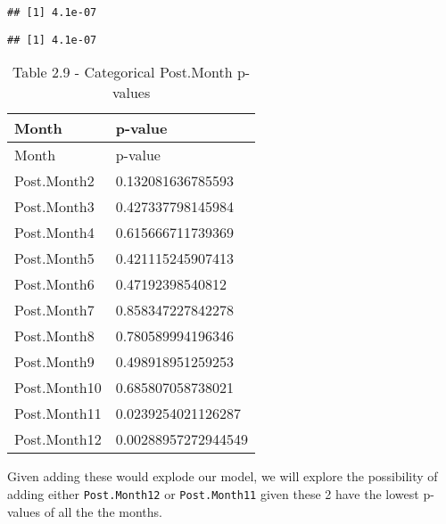 \documentclass[
]{article}
\begin{document}
\begin{verbatim}
## [1] 4.1e-07
\end{verbatim}

\begin{verbatim}
## [1] 4.1e-07
\end{verbatim}

\begin{longtable}[]{@{}ll@{}}
\caption{Table 2.9 - Categorical Post.Month p-values}\tabularnewline
\toprule
Month & p-value\tabularnewline
\midrule
\endfirsthead
\toprule
Month & p-value\tabularnewline
\midrule
\endhead
Post.Month2 & 0.132081636785593\tabularnewline
Post.Month3 & 0.427337798145984\tabularnewline
Post.Month4 & 0.615666711739369\tabularnewline
Post.Month5 & 0.421115245907413\tabularnewline
Post.Month6 & 0.47192398540812\tabularnewline
Post.Month7 & 0.858347227842278\tabularnewline
Post.Month8 & 0.780589994196346\tabularnewline
Post.Month9 & 0.498918951259253\tabularnewline
Post.Month10 & 0.685807058738021\tabularnewline
Post.Month11 & 0.0239254021126287\tabularnewline
Post.Month12 & 0.00288957272944549\tabularnewline
\bottomrule
\end{longtable}

Given adding these would explode our model, we will explore the
possibility of adding either \texttt{Post.Month12} or
\texttt{Post.Month11} given these 2 have the lowest p-values of all the
the months.
\end{document}
